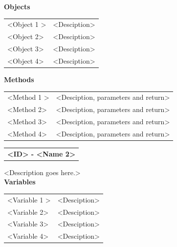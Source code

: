 \documentclass [10pt]{article}
\begin{document}
\textbf{Objects} 
\begin{longtable}{ p{ }  p{ }} \\ 

 
\rowcolor{tableCell} <Object 1 >& <Desciption> \\ 
<Object 2>& <Desciption> \\

\rowcolor{tableCell}<Object 3> & <Desciption> \\ 
<Object 4>& <Desciption> \\

\end{longtable}


\textbf{Methods} 
\begin{longtable}{ p{ }  p{ }} \\ 

 
\rowcolor{tableCell} <Method 1 >& <Desciption, parameters and return>\\ 
<Method 2>& <Desciption, parameters and return>\\

\rowcolor{tableCell}<Method 3> & <Desciption, parameters and return> \\ 
<Method 4>& <Desciption, parameters and return> \\

\end{longtable}





\begin{longtable}{p{}}
\rowcolor{subsectionC}\textbf{<ID> - <Name 2>} \\
\end{longtable}
<Description goes here.>  \\

\textbf{Variables} 

\begin{longtable}{ p{ }  p{ }} \\ 

 
\rowcolor{tableCell} <Variable 1 >& <Desciption> \\ 
<Variable 2>& <Desciption> \\

\rowcolor{tableCell}<Variable 3> & <Desciption> \\ 
<Variable 4>& <Desciption> \\

\end{longtable}
\end{document}

